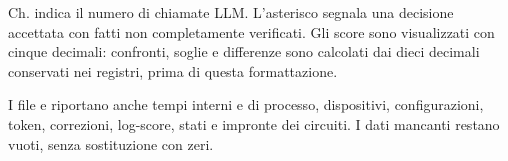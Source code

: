 \documentclass[11pt,a4paper]{article}
\begin{document}
\endgroup

Ch. indica il numero di chiamate LLM. L'asterisco segnala una decisione
accettata con fatti non completamente verificati. Gli score sono visualizzati
con cinque decimali: confronti, soglie e differenze sono calcolati dai dieci decimali
conservati nei registri, prima di questa formattazione.

I file  e  riportano anche
tempi interni e di processo, dispositivi, configurazioni, token, correzioni,
log-score, stati e impronte dei circuiti. I dati mancanti restano vuoti,
senza sostituzione con zeri.

\label{ultima}
\end{document}
